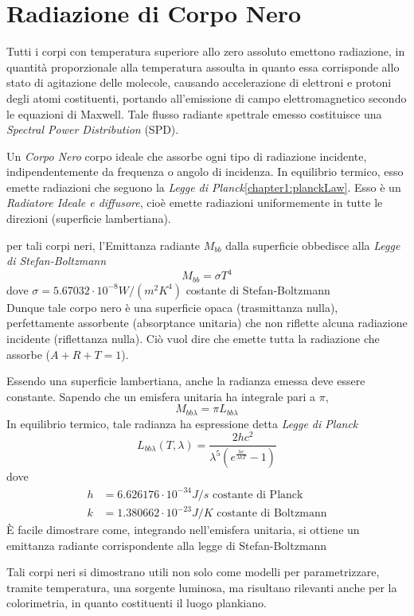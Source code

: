 \section{Radiazione di Corpo Nero}
Tutti i corpi con temperatura superiore allo zero assoluto emettono radiazione, in quantit\`a proporzionale alla temperatura assoulta in quanto essa 
corrisponde allo stato di agitazione delle molecole, causando accelerazione di elettroni e protoni degli atomi costituenti, portando all'emissione 
di campo elettromagnetico secondo le equazioni di Maxwell. Tale flusso radiante spettrale emesso costituisce una \textit{Spectral Power Distribution}
(SPD). \par
Un \textit{Corpo Nero} corpo ideale che assorbe ogni tipo di radiazione incidente, indipendentemente da frequenza o angolo di incidenza. In
equilibrio termico, esso emette radiazioni che seguono la \textit{Legge di Planck}\ref{chapter1:planckLaw}. Esso \`e un 
\textit{Radiatore Ideale e diffusore}, cio\`e emette radiazioni uniformemente in tutte le direzioni (superficie lambertiana).\par
per tali corpi neri, l'Emittanza radiante $M_{bb}$ dalla superficie obbedisce alla \textit{Legge di Stefan-Boltzmann}
\begin{equation}
	M_{bb} = \sigma T^4
\end{equation}
dove $\sigma = 5.67032\cdot 10^{-8} \si{W/(m^2 K^4)}$ costante di Stefan-Boltzmann\\
Dunque tale corpo nero \`e una superficie opaca (trasmittanza nulla), perfettamente assorbente (absorptance unitaria) che non riflette alcuna radiazione
incidente (riflettanza nulla). Ci\`o vuol dire che emette tutta la radiazione che assorbe ($A+R+T=1$).\par
Essendo una superficie lambertiana, anche la radianza emessa deve essere constante. Sapendo che un emisfera unitaria ha integrale pari a $\pi$,
\begin{equation}
	M_{bb\lambda} = \pi L_{bb\lambda}
\end{equation}
In equilibrio termico, tale radianza ha espressione detta \textit{Legge di Planck}
\begin{equation}\label{chapter1:planckLaw}
	L_{bb\lambda}(T,\lambda) = \frac{2hc^2}{\lambda^5\left(e^{\frac{hc}{\lambda kT}}-1\right)}
\end{equation}
dove
\begin{align}
	h &= 6.626176\cdot 10^{-34} \si{J/s}\text{ costante di Planck}\\
	k &= 1.380662\cdot 10^{-23} \si{J/K}\text{ costante di Boltzmann}
\end{align}
\`E facile dimostrare come, integrando nell'emisfera unitaria, si ottiene un emittanza radiante corrispondente alla legge di Stefan-Boltzmann\par
Tali corpi neri si dimostrano utili non solo come modelli per parametrizzare, tramite temperatura, una sorgente luminosa, ma risultano rilevanti 
anche per la colorimetria, in quanto costituenti il luogo plankiano.\par
